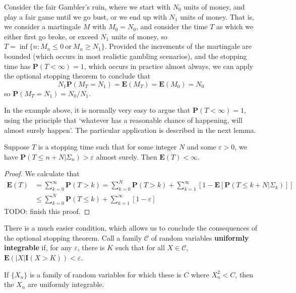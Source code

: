 \begin{example}
    Consider the fair Gambler's ruin, where we start with $N_0$ units of money, and play a fair game until we go bust, or we end up with $N_1$ units of money. That is, we consider a martingale $M$ with $M_0 = N_0$, and consider the time $T$ as which we either first go broke, or exceed $N_1$ units of money, so $T = \inf \{ n: M_n \leq 0\ \text{or}\ M_n \geq N_1 \}$. Provided the increments of the martingale are bounded (which occurs in most realistic gambling scenarios), and the stopping time has $\mathbf{P}(T < \infty) = 1$, which occurs in practice almost always, we can apply the optional stopping theorem to conclude that
    \[ N_1 \mathbf{P}(M_T = N_1) = \mathbf{E}(M_T) = \mathbf{E}(M_0) = N_0 \]
    so $\mathbf{P}(M_T = N_1) = N_0/N_1$.
\end{example}

In the example above, it is normally very easy to argue that $\mathbf{P}(T < \infty) = 1$, using the principle that `whatever has a reasonable chance of happening, will almost surely happen'. The particular application is described in the next lemma.

\begin{lemma}
    Suppose $T$ is a stopping time such that for some integer $N$ and some $\varepsilon > 0$, we have $\mathbf{P}(T \leq n + N | \Sigma_n) > \varepsilon$ almost surely. Then $\mathbf{E}(T) < \infty$.
\end{lemma}
\begin{proof}
    We calculate that
    \begin{align*}
        \mathbf{E}(T) &= \sum_{k = 0}^\infty \mathbf{P}(T > k) = \sum_{k = 0}^N \mathbf{P}(T > k) + \sum_{k = 1}^\infty [1 - \mathbf{E}[\mathbf{P}(T \leq k + N|\Sigma_k)]]\\
        &\leq \sum_{k = 0}^N \mathbf{P}(T \leq k) + \sum_{k = 1}^\infty [1 - \varepsilon]
    \end{align*}
    TODO: finish this proof.
\end{proof}

There is a much easier condition, which allows us to conclude the consequences of the optional stopping theorem. Call a family $\mathcal{C}$ of random variables {\bf uniformly integrable} if, for any $\varepsilon$, there is $K$ such that for all $X \in \mathcal{C}$, $\mathbf{E}(|X| \mathbf{I}(X > K)) < \varepsilon$.

\begin{lemma}
    If $\{ X_n \}$ is a family of random variables for which these is $C$ where $X_n^2 < C$, then the $X_n$ are uniformly integrable.
\end{lemma}

